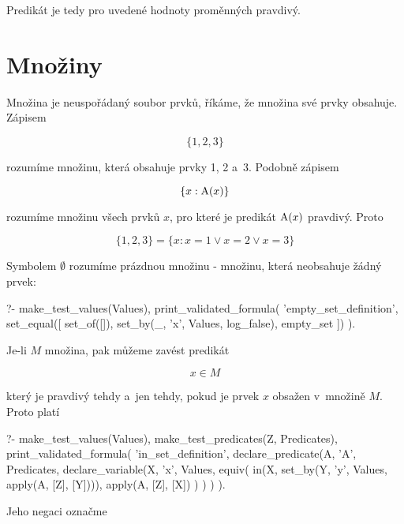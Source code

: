 Predikát je tedy pro uvedené hodnoty proměnných pravdivý.

\section{Množiny}

Množina je neuspořádaný soubor prvků, říkáme, že množina své prvky obsahuje. Zápisem

\begin{equation}
\{1, 2, 3\}
\end{equation}

rozumíme množinu, která obsahuje prvky 1, 2 a~3. Podobně zápisem

\begin{equation}
\{x: \mathrm{A}(x)\}
\end{equation}

rozumíme množinu všech prvků \(x\), pro které je predikát \(\mathrm{A}(x)\) pravdivý. Proto

\begin{equation}
\{1, 2, 3\} = \{x: x = 1 \lor x = 2 \lor x = 3\}
\end{equation}

Symbolem \(\emptyset\) rozumíme prázdnou množinu - množinu, která neobsahuje žádný prvek:

\begin{prolog}
?-	make_test_values(Values),
	print_validated_formula(
		'empty_set_definition',
		set_equal([
			set_of([]),
			set_by(_, 'x', Values, log_false),
			empty_set
		])
	).
\end{prolog}

Je-li \(M\) množina, pak můžeme zavést predikát

\begin{equation}
x \in M
\end{equation}

který je pravdivý tehdy a~jen tehdy, pokud je prvek \(x\) obsažen v~množině \(M\). Proto platí

\begin{prolog}
?-	make_test_values(Values),
	make_test_predicates(Z, Predicates),
	print_validated_formula(
		'in_set_definition',
		declare_predicate(A, 'A', Predicates,
			declare_variable(X, 'x', Values,
				equiv(
					in(X, set_by(Y, 'y', Values, apply(A, [Z], [Y]))),
					apply(A, [Z], [X])
				)
			)
		)
	).
\end{prolog}

Jeho negaci označme

